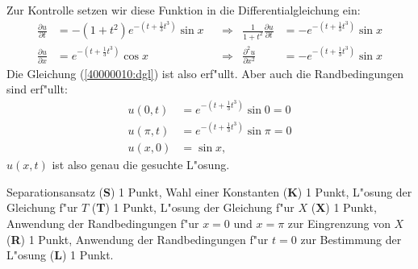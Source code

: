\begin{diskussion}
Zur Kontrolle setzen wir diese Funktion in die Differentialgleichung
ein:
\begin{align*}
\frac{\partial u}{\partial t}&=
-(1+t^2)
e^{-(t+\frac13t^3)}
\sin x
&&\Rightarrow&
\frac1{1+t^2}\frac{\partial u}{\partial t}&=
-e^{-(t+\frac13t^3)}
\sin x
\\
\frac{\partial u}{\partial x}&=
e^{-(t+\frac13t^3)}
\cos x
&&\Rightarrow&
\frac{\partial^2 u}{\partial x^2}&=
-e^{-(t+\frac13t^3)}
\sin x
\end{align*}
Die Gleichung (\ref{40000010:dgl}) ist also erf"ullt.
Aber auch die Randbedingungen sind erf"ullt:
\begin{align*}
u(0,t)&=e^{-(t+\frac13t^3)}\sin 0=0\\
u(\pi,t)&=e^{-(t+\frac13t^3)}\sin\pi=0\\
u(x,0)&=\sin x,
\end{align*}
$u(x,t)$ ist also genau die gesuchte L"osung.
\end{diskussion}

\begin{bewertung}
Separationsansatz ({\bf S}) 1 Punkt,
Wahl einer Konstanten ({\bf K}) 1 Punkt,
L"osung der Gleichung f"ur $T$ ({\bf T}) 1 Punkt,
L"osung der Gleichung f"ur $X$ ({\bf X}) 1 Punkt,
Anwendung der Randbedingungen f"ur $x=0$ und $x=\pi$
zur Eingrenzung von $X$ ({\bf R}) 1 Punkt,
Anwendung der Randbedingungen f"ur $t=0$ zur Bestimmung
der L"osung ({\bf L}) 1 Punkt.
\end{bewertung}

